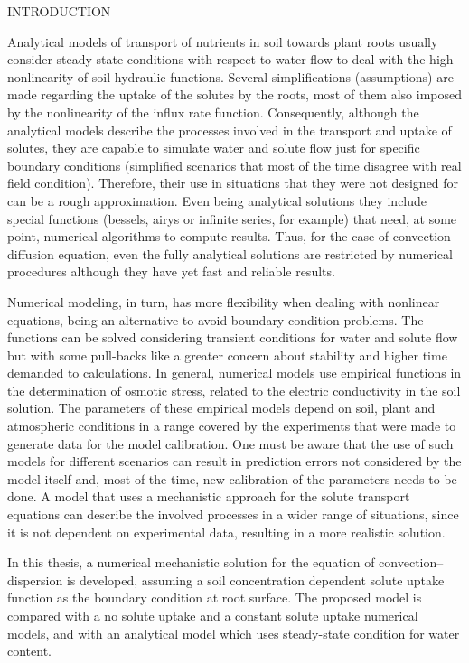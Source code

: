 \cleardoublepage
\chap INTRODUCTION

Analytical models of transport of nutrients in soil towards plant roots usually consider steady-state conditions with respect to water flow to deal with the high nonlinearity of soil hydraulic functions. 
Several simplifications (assumptions) are made regarding the uptake of the solutes by the roots, most of them also imposed by the nonlinearity of the influx rate function. 
Consequently, although the analytical models describe the processes involved in the transport and uptake of solutes, they are capable to simulate water and solute flow just for specific boundary conditions (simplified scenarios that most of the time  disagree with real field condition). Therefore, their use in situations that they were not designed for can be a rough approximation.
Even being analytical solutions they include special functions (bessels, airys or infinite series, for example) that need, at some point, numerical algorithms to compute results.
Thus, for the case of convection-diffusion equation, even the fully analytical solutions are restricted by numerical procedures although they have yet fast and reliable results.

Numerical modeling, in turn, has more flexibility when dealing with nonlinear equations, being an alternative to avoid boundary condition problems. 
The functions can be solved considering transient conditions for water and solute flow but with some pull-backs like a greater concern about stability and higher time demanded to calculations.
In general, numerical models use empirical functions in the determination of osmotic stress, related to the electric conductivity in the soil solution. 
The parameters of these empirical models depend on soil, plant and atmospheric conditions in a range covered by the experiments that were made to generate data for the model calibration. 
One must be aware that the use of such models for different scenarios can result in prediction errors 
not considered by the model itself and, most of the time, new calibration of the parameters needs to be done.
A model that uses a mechanistic approach for the solute transport equations can describe the involved processes in a wider range of situations, since it is not dependent on experimental data, resulting in a more realistic solution.

In this thesis, a numerical mechanistic solution for the equation of convection--dispersion is developed, assuming a soil concentration dependent solute uptake function as the boundary condition at root surface. The proposed model is compared with a no solute uptake and a constant solute uptake numerical models, and with an analytical model which uses steady-state condition for water content. 


